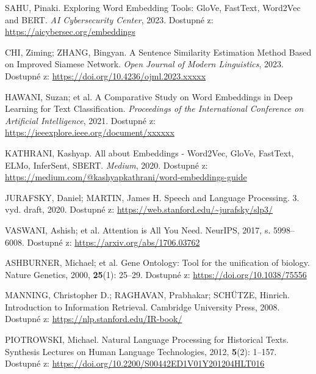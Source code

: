 \documentclass[czech, ba, kiv, he]{fasthesis}
\begin{document}
\begin{thebibliography}{20}
SAHU, Pinaki.
Exploring Word Embedding Tools: GloVe, FastText, Word2Vec and BERT.
\textit{AI Cybersecurity Center}, 2023.
Dostupné z: \url{https://aicybersec.org/embeddings}

CHI, Ziming; ZHANG, Bingyan.
A Sentence Similarity Estimation Method Based on Improved Siamese Network.
\textit{Open Journal of Modern Linguistics}, 2023.
Dostupné z: \url{https://doi.org/10.4236/ojml.2023.xxxxx}

HAWANI, Suzan; et al.
A Comparative Study on Word Embeddings in Deep Learning for Text Classification.
\textit{Proceedings of the International Conference on Artificial Intelligence}, 2021.
Dostupné z: \url{https://ieeexplore.ieee.org/document/xxxxxx}

KATHRANI, Kashyap.
All about Embeddings - Word2Vec, GloVe, FastText, ELMo, InferSent, SBERT.
\textit{Medium}, 2020.
Dostupné z: \url{https://medium.com/@kashyapkathrani/word-embeddings-guide}

JURAFSKY, Daniel; MARTIN, James H.
Speech and Language Processing. 3. vyd. draft, 2020.
Dostupné z: \url{https://web.stanford.edu/~jurafsky/slp3/}

VASWANI, Ashish; et al.
Attention is All You Need.
NeurIPS, 2017, s. 5998–6008.
Dostupné z: \url{https://arxiv.org/abs/1706.03762}

ASHBURNER, Michael; et al.
Gene Ontology: Tool for the unification of biology.
Nature Genetics, 2000, \textbf{25}(1): 25–29.
Dostupné z: \url{https://doi.org/10.1038/75556}

MANNING, Christopher D.; RAGHAVAN, Prabhakar; SCHÜTZE, Hinrich.
Introduction to Information Retrieval. Cambridge University Press, 2008.
Dostupné z: \url{https://nlp.stanford.edu/IR-book/}

PIOTROWSKI, Michael.
Natural Language Processing for Historical Texts.
Synthesis Lectures on Human Language Technologies, 2012, \textbf{5}(2): 1–157.
Dostupné z: \url{https://doi.org/10.2200/S00442ED1V01Y201204HLT016}

\end{thebibliography}



\listoffigures
\listoftables
\listoflistings
\appendix
\backmatter

\backpage
\end{document}
